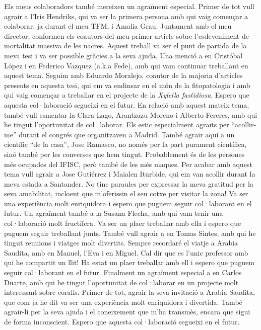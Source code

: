 {%
Els meus colaboradors també mereixen un agraïment especial. Primer de tot vull
agrair a l'Iris Hendriks, qui va ser la primera persona amb qui vaig començar a
colaborar, ja durant el meu TFM, i Amalia Grau. Juntament amb el meu director,
conformen els coautors del meu primer article sobre l'esdeveniment de
mortalitat massiva de les nacres. Aquest treball va ser el punt de partida de
la meva tesi i va ser possible gràcies a la seva ajuda. Una menció a en
Cristóbal López i en Federico Vazquez (a.k.a Fede), amb qui vam continuar
treballant en aquest tema. Seguim amb Eduardo Moralejo, coautor de la majoria
d'articles presents en aquesta tesi, qui em va endinsar en el món de la
fitopatologia i amb qui vaig començar a treballar en el projecte de la
\textit{Xylella fastidiosa}. Espero que aquesta col·laboració segueixi en el
futur. En relació amb aquest mateix tema, també vull esmentar la Clara Lago,
Arantzazu Moreno i Alberto Fereres, amb qui he tingut l'oportunitat de
col·laborar. Els estic especialment agraïts per ``acollir-me'' durant el
congrés que organitzaven a Madrid. També agrair aquí a un científic ``de la
casa'', Jose Ramasco, no només per la part purament científica, sinó també per
les converses que hem tingut. Probablement és de les persones més ocupades del
IFISC, però també de les més maques. Per acabar amb aquest tema vull agrair a
Jose Gutiérrez i Maialen Iturbide, qui em van acollir durant la meva estada a
Santander. No tinc paraules per expressar la meva gratitud per la seva
amabilitat, incloent que m'oferissin el seu cotxe per visitar la zona! Va ser
una experiència molt enriquidora i espero que puguem seguir col·laborant en el
futur. Un agraïment també a la Susana Flecha, amb qui vam tenir una
col·laboració molt fructífera. Va ser un plaer treballar amb ella i espero que
puguem seguir treballant junts. També vull agrair a en Tomas Sintes, amb qui he
tingut reunions i viatges molt divertits. Sempre recordaré el viatje a Arabia
Saudita, amb en Manuel, l'Eva i en Miguel. Cal dir que es l'unic professor amb
qui he compartit un llit! Ha estat un plaer treballar amb ell i espero que
puguem seguir col·laborant en el futur. Finalment un agraïment especial a en
Carlos Duarte, amb qui he tingut l'oportunitat de col·laborar en un projecte
molt interessant sobre coralls. Primer de tot, agrair la seva invitació a
Arabia Saudita, que com ja he dit va ser una experiència molt
enriquidora i divertida. També agrair-li per la seva ajuda i el coneixement que
m'ha transmès, encara que sigui de forma inconscient. Espero que aquesta
col·laboració segueixi en el futur. \\

}

